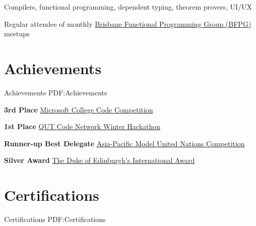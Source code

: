 \documentclass[a4paper,10pt,oneside]{article}
\begin{document}
\begin{body}
\par Compilers, functional programming, dependent typing, theorem provers, UI/UX
\par Regular attendee of monthly \href{https://www.meetup.com/en-AU/Brisbane-Functional-Programming-Group/}{Brisbane Functional Programming Group (BFPG)} meetups


\section
{Achievements}
{Achievements}
{PDF:Achievements}

\par \textbf{3rd Place}
\href{https://msft3c.com/}{Microsoft College Code Competition}
\hfill {}

\par \textbf{1st Place}
\href{https://codenetwork.co/hackathon-2017/}{QUT Code Network Winter Hackathon}
\hfill {}

\par \textbf{Runner-up Best Delegate}
\href{http://www.amunc.net/}{Asia-Pacific Model United Nations Competition} 
\hfill {}

\par \textbf{Silver Award}
\href{http://www.dukeofed.com.au/}{The Duke of Edinburgh’s International Award}
\hfill {}

\section
{Certifications}
{Certifications}
{PDF:Certifications}





\end{body}
\end{document}
